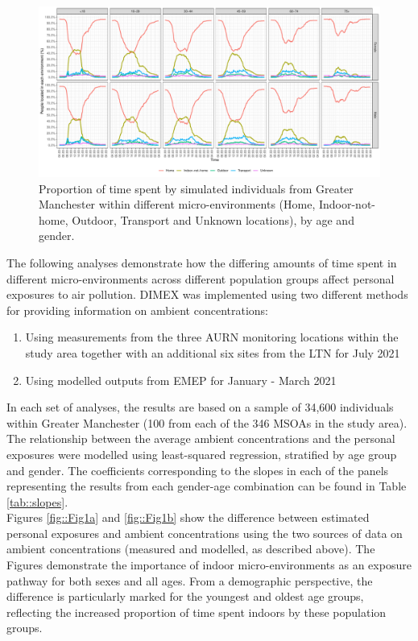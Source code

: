 \documentclass{article}
\begin{document}
\begin{figure}[!hbtp]
	\centering
	\includegraphics[width=0.95\linewidth]{Figures/TimeUse_AgeGr_sex}		
	\caption{Proportion of time spent by simulated individuals from Greater Manchester within different micro-environments (Home, Indoor-not-home, Outdoor, Transport and Unknown locations), by age and gender. } \label{fig::TimeUse_AgeGr_sex_Manchester}
\end{figure}

\noindent The following analyses demonstrate how the differing amounts of time spent in different micro-environments across different population groups affect personal exposures to air pollution. DIMEX was implemented using two different methods for providing information on ambient concentrations:

\begin{enumerate}
\item  Using measurements from the three AURN monitoring locations within the study area together with an additional six sites from the LTN for July 2021
\item  Using modelled outputs from EMEP for January - March 2021
\end{enumerate}

\noindent In each set of analyses, the results are based on a sample of 34,600 individuals within Greater Manchester (100 from each of the 346 MSOAs in the study area). The relationship between the average ambient concentrations and the personal exposures were modelled using  least-squared regression, stratified by age group and gender. The coefficients corresponding to the slopes in each of the panels representing the results from each gender-age combination can be found in Table \ref{tab::slopes}. \\

\noindent Figures \ref{fig::Fig1a} and \ref{fig::Fig1b} show the difference between estimated personal exposures and ambient concentrations using the two sources of data on ambient concentrations (measured and modelled, as described above). The Figures demonstrate the importance of indoor micro-environments as an exposure pathway for both sexes and all ages. From a demographic perspective, the difference is particularly marked for the youngest and oldest age groups, reflecting the increased proportion of time spent indoors by these population groups. \\
\end{document}
